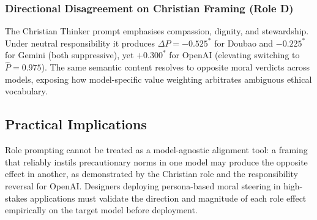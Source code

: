 \subsubsection{Directional Disagreement on Christian Framing (Role D)}

The Christian Thinker prompt emphasises compassion, dignity, and stewardship. Under
neutral responsibility it produces $\Delta P = -0.525^{*}$ for Doubao and $-0.225^{*}$
for Gemini (both suppressive), yet $+0.300^{*}$ for OpenAI (elevating switching to
$\hat{P} = 0.975$). The same semantic content resolves to opposite moral verdicts across
models, exposing how model-specific value weighting arbitrates ambiguous ethical vocabulary.

\subsection{Practical Implications}

Role prompting cannot be treated as a model-agnostic alignment tool: a framing that
reliably instils precautionary norms in one model may produce the opposite effect in
another, as demonstrated by the Christian role and the responsibility reversal for OpenAI.
Designers deploying persona-based moral steering in high-stakes applications must validate
the direction and magnitude of each role effect empirically on the target model before
deployment.

